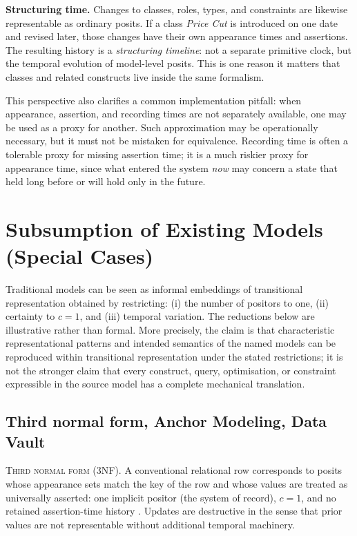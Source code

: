 \documentclass[a4paper,fleqn]{cas-sc}
\begin{document}
\textbf{Structuring time.} Changes to classes, roles, types, and constraints are likewise representable as ordinary posits. If a class \textit{Price Cut} is introduced on one date and revised later, those changes have their own appearance times and assertions. The resulting history is a \emph{structuring timeline}: not a separate primitive clock, but the temporal evolution of model-level posits. This is one reason it matters that classes and related constructs live inside the same formalism.

This perspective also clarifies a common implementation pitfall: when appearance, assertion, and recording times are not separately available, one may be used as a proxy for another. Such approximation may be operationally necessary, but it must not be mistaken for equivalence. Recording time is often a tolerable proxy for missing assertion time; it is a much riskier proxy for appearance time, since what entered the system \emph{now} may concern a state that held long before or will hold only in the future.

\section{Subsumption of Existing Models (Special Cases)}
Traditional models can be seen as informal embeddings of transitional representation obtained by restricting: (i) the number of positors to one, (ii) certainty to \(c=1\), and (iii) temporal variation. The reductions below are illustrative rather than formal. More precisely, the claim is that characteristic representational patterns and intended semantics of the named models can be reproduced within transitional representation under the stated restrictions; it is not the stronger claim that every construct, query, optimisation, or constraint expressible in the source model has a complete mechanical translation.

\subsection{Third normal form, Anchor Modeling, Data Vault}
\textsc{Third normal form (3NF).} A conventional relational row corresponds to posits whose appearance sets match the key of the row and whose values are treated as universally asserted: one implicit positor (the system of record), \(c=1\), and no retained assertion-time history \cite{Kent,Codd}. Updates are destructive in the sense that prior values are not representable without additional temporal machinery.
\end{document}
